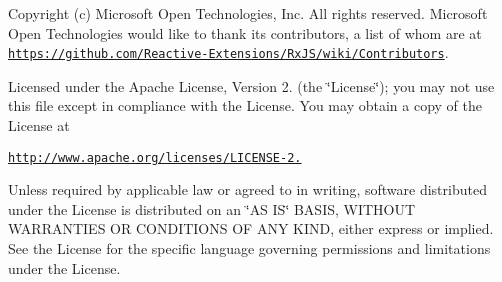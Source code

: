 Copyright (c) Microsoft Open Technologies, Inc. All rights reserved. Microsoft Open Technologies would like to thank its contributors, a list of whom are at \href{https://github.com/Reactive-Extensions/RxJS/wiki/Contributors}{\tt https\+://github.\+com/\+Reactive-\/\+Extensions/\+Rx\+J\+S/wiki/\+Contributors}.

Licensed under the Apache License, Version 2. (the \char`\"{}\+License\char`\"{}); you may not use this file except in compliance with the License. You may obtain a copy of the License at

\href{http://www.apache.org/licenses/LICENSE-2.0}{\tt http\+://www.\+apache.\+org/licenses/\+L\+I\+C\+E\+N\+S\+E-\/2.}

Unless required by applicable law or agreed to in writing, software distributed under the License is distributed on an \char`\"{}\+A\+S I\+S\char`\"{} B\+A\+S\+IS, W\+I\+T\+H\+O\+UT W\+A\+R\+R\+A\+N\+T\+I\+ES OR C\+O\+N\+D\+I\+T\+I\+O\+NS OF A\+NY K\+I\+ND, either express or implied. See the License for the specific language governing permissions and limitations under the License. 
